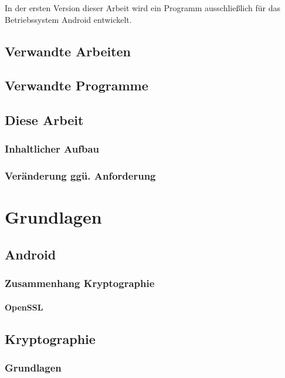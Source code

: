 \documentclass[10pt, a4paper]{scrreprt}
\begin{document}
In der ersten Version dieser Arbeit wird ein Programm ausschließlich für das Betriebssystem Android entwickelt.
\chapter{Verwandte Arbeiten}
\chapter{Verwandte Programme}
\chapter{Diese Arbeit}
\section{Inhaltlicher Aufbau}
\section{Veränderung ggü. Anforderung}

\part{Grundlagen}
\chapter{Android}
\section{Zusammenhang Kryptographie}
\subsection{OpenSSL}

\chapter{Kryptographie}
\section{Grundlagen}
\end{document}
